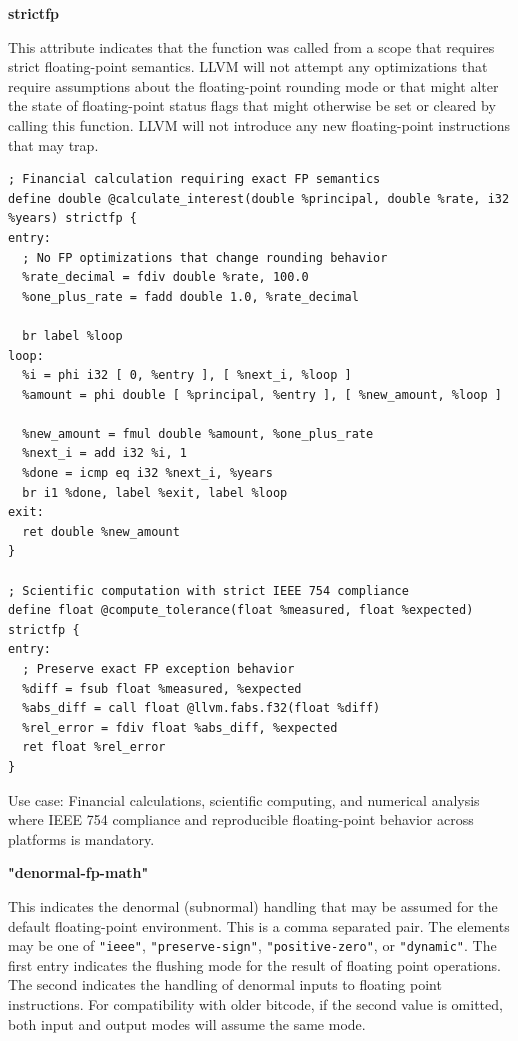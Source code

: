 \textbf{strictfp}

This attribute indicates that the function was called from a scope that requires strict floating-point semantics.
LLVM will not attempt any optimizations that require assumptions about the floating-point rounding mode or that might alter the state of floating-point status flags that might otherwise be set or cleared by calling this function.
LLVM will not introduce any new floating-point instructions that may trap.

\begin{lstlisting}[style=ir]
; Financial calculation requiring exact FP semantics
define double @calculate_interest(double %principal, double %rate, i32 %years) strictfp {
entry:
  ; No FP optimizations that change rounding behavior
  %rate_decimal = fdiv double %rate, 100.0
  %one_plus_rate = fadd double 1.0, %rate_decimal

  br label %loop
loop:
  %i = phi i32 [ 0, %entry ], [ %next_i, %loop ]
  %amount = phi double [ %principal, %entry ], [ %new_amount, %loop ]

  %new_amount = fmul double %amount, %one_plus_rate
  %next_i = add i32 %i, 1
  %done = icmp eq i32 %next_i, %years
  br i1 %done, label %exit, label %loop
exit:
  ret double %new_amount
}

; Scientific computation with strict IEEE 754 compliance
define float @compute_tolerance(float %measured, float %expected) strictfp {
entry:
  ; Preserve exact FP exception behavior
  %diff = fsub float %measured, %expected
  %abs_diff = call float @llvm.fabs.f32(float %diff)
  %rel_error = fdiv float %abs_diff, %expected
  ret float %rel_error
}
\end{lstlisting}

Use case: Financial calculations, scientific computing, and numerical analysis where IEEE 754 compliance and reproducible floating-point behavior across platforms is mandatory.

\textbf{"denormal-fp-math"}

This indicates the denormal (subnormal) handling that may be assumed for the default floating-point environment.
This is a comma separated pair.
The elements may be one of \texttt{"ieee"}, \texttt{"preserve-sign"}, \texttt{"positive-zero"}, or \texttt{"dynamic"}.
The first entry indicates the flushing mode for the result of floating point operations.
The second indicates the handling of denormal inputs to floating point instructions.
For compatibility with older bitcode, if the second value is omitted, both input and output modes will assume the same mode.

